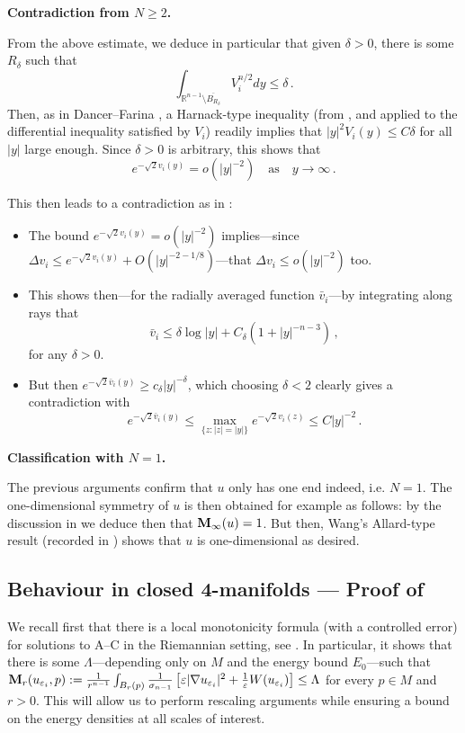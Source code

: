 \documentclass{article}
\newcommand{\R}{\mathbb{R}}
\newcommand{\ep}{\varepsilon}
\theoremstyle{definition}
\begin{document}
{\bf Contradiction from $N\geq 2$.}

From the above estimate, we deduce in particular that given $\delta>0$, there is some $R_\delta$ such that
$$\int_{\R^{n-1}\setminus \overline{B_{R_\delta}}} V_i^{n/2} dy\leq \delta\,.$$
Then, as in Dancer--Farina \cite{DF09}, a Harnack-type inequality (from \cite{Serrin64, Tru67}, and applied to the differential inequality satisfied by $V_i$) readily implies that $|y|^2V_i(y)\leq C\delta$ for all $|y|$ large enough. Since $\delta>0$ is arbitrary, this shows that
$$
e^{-\sqrt{2} v_i(y)} = o(|y|^{-2})\quad\mbox{as}\quad y\to\infty\,.
$$

This then leads to a contradiction as in \cite{DF09}:
\begin{itemize}
\item The bound $
e^{-\sqrt{2} v_i(y)} = o(|y|^{-2})$ implies---since $\Delta v_i\leq e^{-\sqrt{2} v_i(y)}+O(|y|^{-2-1/8})$---that $
\Delta v_i \leq o(|y|^{-2})$ too.
\item This shows then---for the radially averaged function $\bar v_i$---by integrating along rays that
$$\bar v_i\leq \delta\log|y|+C_\delta(1+|y|^{-{n-3}})\,,$$
for any $\delta>0$.
\item But then $
e^{-\sqrt{2} \bar v_i(y)}\geq c_\delta|y|^{-\delta}$, which choosing $\delta<2$ clearly gives a contradiction with
$$
e^{-\sqrt{2} \bar v_i(y)}\leq\max_{\{z:|z|=|y|\}}e^{-\sqrt{2} v_i(z)} \leq C|y|^{-2}\,.$$
\end{itemize}

{\bf Classification with $N=1$.}

The previous arguments confirm that $u$ only has one end indeed, i.e. $N=1$. The one-dimensional symmetry of $u$ is then obtained for example as follows: by the discussion in  we deduce then that ${\bf M}_\infty(u)=1$. But then, Wang's Allard-type result (recorded in ) shows that $u$ is one-dimensional as desired.

\subsection{Behaviour in closed 4-manifolds --- Proof of }\label{sec:4closedbeh}
We recall first that there is a local monotonicity formula (with a controlled error) for solutions to A--C in the Riemannian setting, see \cite[Appendix B]{Guaraco2018}. In particular, it shows that there is some $\Lambda$---depending only on $M$ and the energy bound $E_0$---such that ${\bf M}_r(u_{\ep_i},p):=\frac{1}{r^{n-1}}\int_{B_r(p)} \frac{1}{\sigma_{n-1}}\left[\ep|\nabla u_{\ep_i}|^2+\frac{1}{\ep}W(u_{\ep_i})\right]\leq \Lambda$ for every $p\in M$ and $r>0$. This will allow us to perform rescaling arguments while ensuring a bound on the energy densities at all scales of interest.
\end{document}

